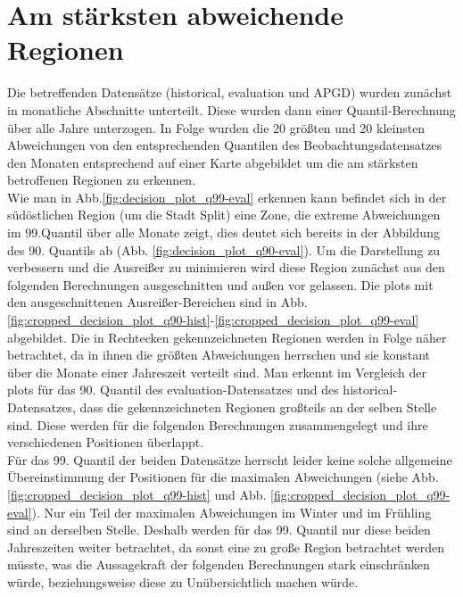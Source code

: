\section{Am stärksten abweichende Regionen}
Die betreffenden Datensätze (historical, evaluation und APGD) wurden zunächst in monatliche Abschnitte unterteilt. Diese wurden dann einer Quantil-Berechnung über alle Jahre unterzogen. In Folge wurden die 20 größten und 20 kleinsten Abweichungen von den entsprechenden Quantilen des Beobachtungsdatensatzes den Monaten entsprechend auf einer Karte abgebildet um die am stärksten betroffenen Regionen zu erkennen.\\
Wie man in Abb.\ref{fig:decision_plot_q99-eval} erkennen kann befindet sich in der südöstlichen Region (um die Stadt Split) eine Zone, die extreme Abweichungen im 99.Quantil über alle Monate zeigt, dies deutet sich bereits in der Abbildung des 90. Quantils ab (Abb. \ref{fig:decision_plot_q90-eval}). Um die Darstellung zu verbessern und die Ausreißer zu minimieren wird diese Region zunächst aus den folgenden Berechnungen ausgeschnitten und außen vor gelassen. Die plots mit den ausgeschnittenen Ausreißer-Bereichen sind in Abb. \ref{fig:cropped_decision_plot_q90-hist}-\ref{fig:cropped_decision_plot_q99-eval} abgebildet. Die in Rechtecken gekennzeichneten Regionen werden in Folge näher betrachtet, da in ihnen die größten Abweichungen herrschen und sie konstant über die Monate einer Jahreszeit verteilt sind. Man erkennt im Vergleich der plots für das 90. Quantil des evaluation-Datensatzes und des historical-Datensatzes, dass die gekennzeichneten Regionen großteils an der selben Stelle sind. Diese werden für die folgenden Berechnungen zusammengelegt und ihre verschiedenen Positionen überlappt.\\
Für das 99. Quantil der beiden Datensätze herrscht leider keine solche allgemeine Übereinstimmung der Positionen für die maximalen Abweichungen (siehe Abb. \ref{fig:cropped_decision_plot_q99-hist} und Abb. \ref{fig:cropped_decision_plot_q99-eval}). Nur ein Teil der maximalen Abweichungen im Winter und im Frühling sind an derselben Stelle. Deshalb werden für das 99. Quantil nur diese beiden Jahreszeiten weiter betrachtet, da sonst eine zu große Region betrachtet werden müsste, was die Aussagekraft der folgenden Berechnungen stark einschränken würde, beziehungsweise diese zu Unübersichtlich machen würde.


